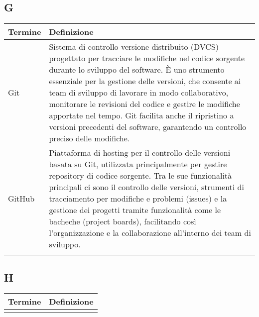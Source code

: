 \documentclass[10pt]{article}
\begin{document}
\subsection{G} %
\begin{tabularx}{\textwidth}{|>{\centering\arraybackslash}l|X|}
\hline
\rowcolor[gray]{0.8}
\textbf{Termine} & \textbf{Definizione}\\
\hline
Git & Sistema di controllo versione distribuito (DVCS) progettato per tracciare le modifiche nel codice sorgente durante lo sviluppo del software. È uno strumento essenziale per la gestione delle versioni, che consente ai team di sviluppo di lavorare in modo collaborativo, monitorare le revisioni del codice e gestire le modifiche apportate nel tempo. Git facilita anche il ripristino a versioni precedenti del software, garantendo un controllo preciso delle modifiche.\\
\hline
GitHub & Piattaforma di hosting per il controllo delle versioni basata su Git, utilizzata principalmente per gestire repository di codice sorgente. Tra le sue funzionalità principali ci sono il controllo delle versioni, strumenti di tracciamento per modifiche e problemi (issues) e la gestione dei progetti tramite funzionalità come le bacheche (project boards), facilitando così l’organizzazione e la collaborazione all’interno dei team di sviluppo.\\
\hline
 & \\
\hline
\end{tabularx}

\subsection{H} %
\begin{tabularx}{\textwidth}{|>{\centering\arraybackslash}l|X|}
\hline
\rowcolor[gray]{0.8}
\textbf{Termine} & \textbf{Definizione}\\
\hline
 & \\
\hline
\end{tabularx}
\end{document}
